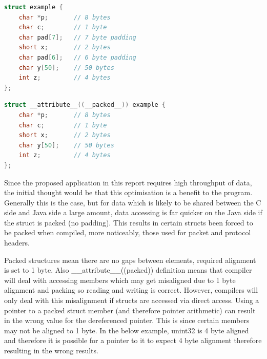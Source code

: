 \documentclass[final_report.tex]{subfiles}
\begin{document}
\begin{lstlisting}[language=C, caption={Example C Struct with compiler inserted padding}, label=lst:c_padded_struct]
struct example {
    char *p;       // 8 bytes
    char c;        // 1 byte
    char pad[7];   // 7 byte padding
    short x;       // 2 bytes
    char pad[6];   // 6 byte padding
    char y[50];    // 50 bytes
    int z;         // 4 bytes
};
\end{lstlisting}

\begin{lstlisting}[language=C, caption={Example C Struct stopping padding}, label=lst:c_packed_struct]
struct __attribute__((__packed__)) example {
    char *p;       // 8 bytes
    char c;        // 1 byte
    short x;       // 2 bytes
    char y[50];    // 50 bytes
    int z;         // 4 bytes
};
\end{lstlisting}

Since the proposed application in this report requires high throughput of data, the initial thought would be that this optimisation is a benefit to the program. Generally this is the case, but for data which is likely to be shared between the C side and Java side a large amount, data accessing is far quicker  on the Java side if the struct is packed (no padding). This results in certain structs been forced to be packed when compiled, more noticeably, those used for packet and protocol headers.

Packed structures mean there are no gaps between elements, required alignment is set to 1 byte. Also \_\_attribute\_\_((packed)) definition means that compiler will deal with accessing members which may get misaligned due to 1 byte alignment and packing so reading and writing is correct. However, compilers will only deal with this misalignment if structs are accessed via direct access. Using a pointer to a packed struct member (and therefore pointer arithmetic) can result in the wrong value for the dereferenced pointer. This is since certain members may not be aligned to 1 byte. In the below example, unint32 is 4 byte aligned and therefore it is possible for a pointer to it to expect 4 byte alignment therefore resulting in the wrong results.
\end{document}
